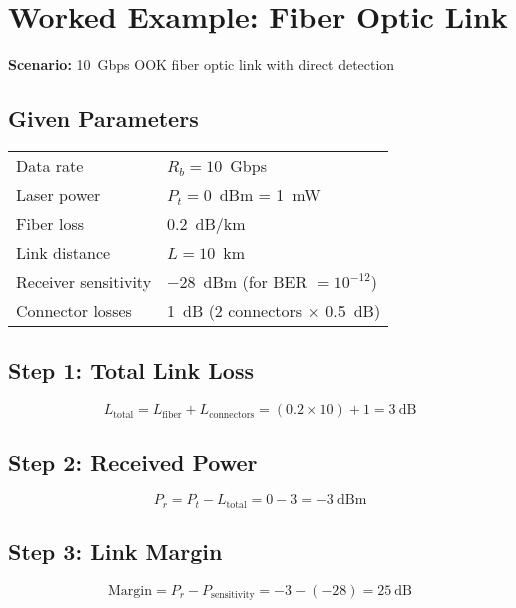 \section{Worked Example: Fiber Optic Link}

\textbf{Scenario:} 10~Gbps OOK fiber optic link with direct detection

\subsection*{Given Parameters}

\begin{tabular}{@{}ll@{}}
Data rate & $R_b = 10$~Gbps \\
Laser power & $P_t = 0$~dBm = 1~mW \\
Fiber loss & 0.2~dB/km \\
Link distance & $L = 10$~km \\
Receiver sensitivity & $-28$~dBm (for BER $= 10^{-12}$) \\
Connector losses & 1~dB (2 connectors $\times$ 0.5~dB) \\
\end{tabular}

\subsection*{Step 1: Total Link Loss}

\begin{equation}
L_{\text{total}} = L_{\text{fiber}} + L_{\text{connectors}} = (0.2 \times 10) + 1 = 3~\text{dB}
\end{equation}

\subsection*{Step 2: Received Power}

\begin{equation}
P_r = P_t - L_{\text{total}} = 0 - 3 = -3~\text{dBm}
\end{equation}

\subsection*{Step 3: Link Margin}

\begin{equation}
\text{Margin} = P_r - P_{\text{sensitivity}} = -3 - (-28) = 25~\text{dB}
\end{equation}

